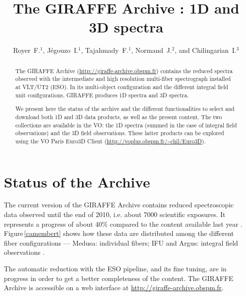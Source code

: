 \documentclass[11pt,twoside]{article}
\begin{document}
\title{The GIRAFFE Archive : 1D and 3D spectra}
\author{Royer~F.$^1$, J\'egouzo~I.$^1$, Tajahmady~F.$^1$, Normand~J.$^2$, and Chilingarian~I.$^3$
}

\begin{abstract}
 The GIRAFFE Archive (\url{http://giraffe-archive.obspm.fr}) contains the reduced spectra observed with the intermediate and high resolution multi-fiber spectrograph installed at VLT/UT2 (ESO). In its multi-object configuration and the different integral field unit configurations, GIRAFFE produces 1D spectra and 3D spectra.

We present here the status of the archive and the different functionalities to select and download both 1D and 3D data products, as well as the present content. The two collections are available in the VO: the 1D spectra (summed in the case of integral field observations) and the 3D field observations. These latter products can be explored using the VO Paris Euro3D Client (\url{http://voplus.obspm.fr/~chil/Euro3D}). 
\end{abstract}

\section{Status of the Archive}

 The current version of the GIRAFFE Archive contains reduced spectroscopic data observed until the end of 2010, i.e. about 7000 scientific exposures. It represents a progress of about 40\% compared to the content available last year \citep{Ror_12}.
Figure\,\ref{camembert} shows how these data are distributed among the different fiber configurations --- Medusa: individual fibers; IFU and Argus: integral field observations \citep[details about the instrument can be found in][]{Pai_02}. 

 The automatic reduction with the ESO pipeline, and its fine tuning, are in progress in order to get a better completeness of the content. The GIRAFFE Archive is accessible on a web interface at \url{http://giraffe-archive.obspm.fr}.
\end{document}
